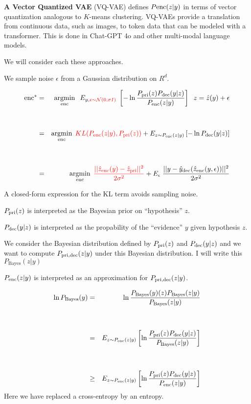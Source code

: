 {\vfill
{\bf A Vector Quantized VAE} (VQ-VAE) defines $P\mathrm{enc}(z|y)$ in terms of vector quantization analogous to $K$-means clustering.
VQ-VAEs provide a translation from continuous data, such as images, to token data that can be modeled with a transformer.
This is done in Chat-GPT 4o and other multi-modal language models.

\vfill
We will consider each these approaches.



\vfill
We sample noise $\epsilon$ from a Gaussian distribution on $R^d$.

\vfill
{\huge
\begin{eqnarray*}
\mathrm{enc}^* & = & \operatorname*{argmin}_{\mathrm{enc}}\;\;E_{y,{\color{red} \epsilon \sim {\cal N}(0,\sigma I)}}\;\left[- \ln \frac{P_{\mathrm{pri}}(z)P_{\mathrm{dec}}(y|z)}{P_{\mathrm{enc}}(z|y)}\right]\;\;z = \hat{z}(y) + \epsilon \\
\\
\\
& = & \operatorname*{argmin}_{\mathrm{enc}}\;{\color{red} KL(P_{\mathrm{enc}}(z|y),P_{\mathrm{pri}}(z))} + E_{z \sim P_{\mathrm{enc}}(z|y)}\left[- \ln P_{\mathrm{dec}}(y|z)\right] \\
\\
\\
&=& \operatorname*{argmin}_{\mathrm{enc}}\;{\color{red} \frac{||\hat{z}_{\mathrm{enc}}(y) - \hat{z}_{\mathrm{pri}}||^2}{2\sigma^2}} + E_\epsilon\;\frac{||y - \hat{y}_{\mathrm{dec}}(\hat{z}_{\mathrm{enc}}(y,\epsilon))||^2}{2\sigma^2}
\end{eqnarray*}


\vfill
A closed-form expression for the KL term avoids sampling noise.
}


$P_{\mathrm{pri}}(z)$ is interpreted as the Bayesian prior on ``hypothesis'' $z$.

\vfill
$P_{\mathrm{dec}}(y|z)$ is interpreted as the propability of the ``evidence'' $y$ given hypothesis $z$.

\vfill
We consider the Bayesian distribution defined by $P_{\mathrm{pri}}(z)$ and $P_{\mathrm{dec}}(y|z)$ and we want to compute $P_{\mathrm{pri},\mathrm{dec}}(z|y)$
under this Bayesian distribution.  I will write this $P_{\mathrm{Bayes}}(z|y)$

\vfill
$P_{\mathrm{enc}}(z|y)$ is interpreted as an approximation for $P_{\mathrm{pri},\mathrm{dec}}(z|y)$.

{\huge
\begin{eqnarray*}
\ln P_{\mathrm{Bayes}}(y) & =  & \ln \frac{P_{\mathrm{Bayes}}(y)(z)P_{\mathrm{Bayes}}(z|y)}{P_{\mathrm{Bayes}}(z|y)} \\
\\
\\
& = & E_{z \sim P_{\mathrm{enc}}(z|y)} \left[\ln \frac{P_{\mathrm{pri}}(z)P_{\mathrm{dec}}(y|z)}{P_{\mathrm{Bayes}}(z|y)}\right] \\
\\
\\
& \geq & E_{z \sim P_{\mathrm{enc}}(z|y)}\left[\ln \frac{P_{\mathrm{pri}}(z)P_{\mathrm{dec}}(y|z)}{P_{\mathrm{enc}}(z|y)}\right] \\
\end{eqnarray*}
}
Here we have replaced a cross-entropy by an entropy.

}
